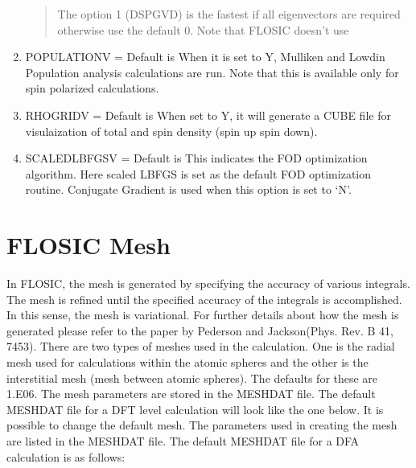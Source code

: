 \documentclass[letterpaper,10pt,english,openany,oneside]{sphinxmanual}
\begin{document}
\begin{enumerate}
\begin{quote}
\sphinxAtStartPar
The option 1 (DSPGVD) is the fastest if all eigenvectors are required otherwise use the default 0.
Note that FLOSIC doesn’t use 
\end{quote}

\item {} 
\sphinxAtStartPar
POPULATIONV   = Default is 
When it is set to Y, Mulliken and Lowdin Population analysis calculations are run. Note that this is available only for spin polarized calculations.

\item {} 
\sphinxAtStartPar
RHOGRIDV  = Default is 
When set to Y,  it will generate a CUBE file for visulaization of total and spin density (spin up \sphinxhyphen{} spin down).

\item {} 
\sphinxAtStartPar
SCALEDLBFGSV  = Default is 
This indicates the FOD optimization algorithm. Here scaled LBFGS is set as the default FOD optimization routine. Conjugate Gradient is used when this option is set to ‘N’.

\end{enumerate}


\chapter{FLOSIC Mesh}
\label{\detokenize{docs/mesh:flosic-mesh}}\label{\detokenize{docs/mesh:mesh}}\label{\detokenize{docs/mesh::doc}}
\sphinxAtStartPar
In FLOSIC, the mesh is generated by specifying the accuracy of various integrals. The mesh is refined until the specified accuracy of
the integrals is accomplished. In this sense, the mesh is variational. For further details about how the mesh is generated please refer to the paper by Pederson and Jackson(Phys. Rev. B 41, 7453).
There are two types of meshes used in the calculation. One is the radial mesh used for calculations within the
atomic spheres and the other is the interstitial mesh (mesh between atomic spheres). The defaults for these are 1.E\sphinxhyphen{}06.
The mesh parameters are stored in the MESHDAT file. The default MESHDAT file for a DFT level calculation will look like the one below.
It is possible to change the default mesh.
The parameters used in creating the mesh are listed in the MESHDAT file. The default MESHDAT file for a DFA calculation is as follows:
\end{document}
